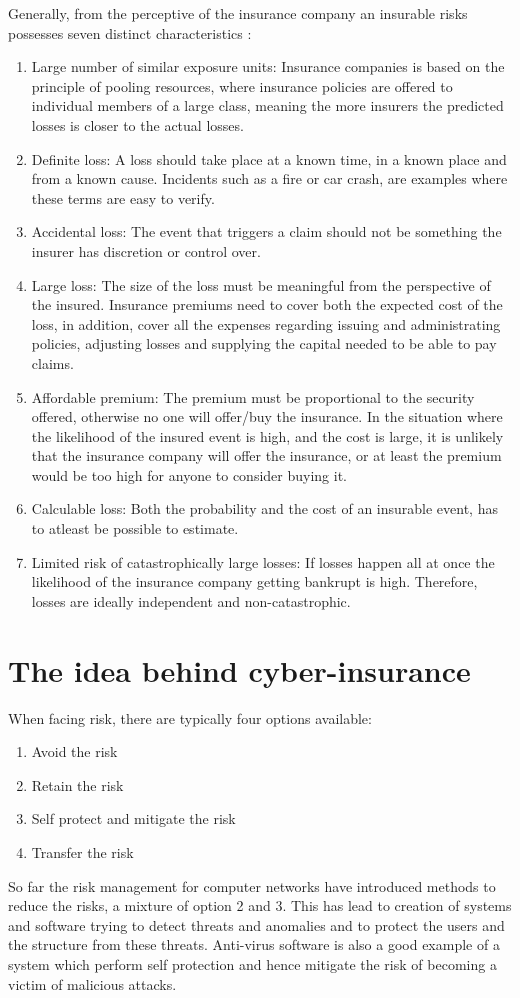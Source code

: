 Generally, from the perceptive of the insurance company an insurable risks possesses seven distinct characteristics \cite{mehr1980principles}: 
   \begin{enumerate}
   \item Large number of similar exposure units: Insurance companies is based on the principle of
    pooling resources, where insurance policies are offered to individual members of a large class,
     meaning the more insurers the predicted losses is closer to the actual losses. 
   \item Definite loss: A loss should take place at a known time, in a known place and from a known
    cause. Incidents such as a fire or car crash, are examples where these terms are easy to verify.
   \item Accidental loss: The event that triggers a claim should not be 
   something the insurer has discretion or control over.
   \item Large loss: The size of the loss must be meaningful from the perspective of the insured.
    Insurance premiums need to cover both the expected cost of the loss, in addition, 
    cover all the expenses regarding issuing and administrating policies, adjusting losses and
     supplying the capital needed to be able to pay claims.
   \item Affordable premium: The premium must be proportional to the security offered, otherwise no
    one will offer/buy the insurance. In the situation where the likelihood of the insured event is
     high, and the cost is large, it is unlikely that the insurance company will offer the insurance,
      or at least the premium would be too high for anyone to consider buying it. 
   \item Calculable loss: Both the probability and the cost of an insurable event,
    has to atleast be possible to estimate. 
   \item Limited risk of catastrophically large losses: If losses happen all at once the likelihood of
    the insurance company getting bankrupt is high. Therefore, losses are ideally independent and non-catastrophic. 
   \end{enumerate}
 
 \section{The idea behind cyber-insurance}
When facing risk, there are typically four options available:
\begin{enumerate}
\item Avoid the risk
\item Retain the risk
\item Self protect and mitigate the risk
\item Transfer the risk
\end{enumerate}
So far the risk management for computer networks have introduced methods to reduce the risks, 
a mixture of option 2 and 3. This has lead to creation of systems and software trying to detect threats and anomalies and to protect the users and the structure from these threats. Anti-virus software is also a good example of a system which perform self protection and hence mitigate the risk of becoming a victim of malicious attacks.

